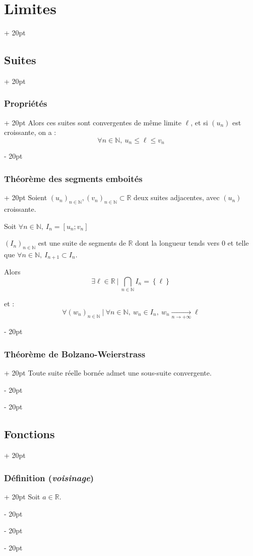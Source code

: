 \documentclass[a4paper, 12pt, twoside]{article}
\newcommand{\N}{\mathbb{N}} %
\newcommand{\R}{\mathbb{R}} %
\newcommand{\tendsto}[1]{\xrightarrow[#1]{}}
\newcommand{\set}[1]{\left\{ #1 \right\}}
\renewcommand{\le}{\leqslant}
\newcommand{\ind}[1][20pt]{\advance\leftskip + #1}
\newcommand{\deind}[1][20pt]{\advance\leftskip - #1}
\newenvironment{indt}[2][20pt]{#2 \par \ind[#1]}{\par \deind} %
\begin{document}
\begin{indt}{\section{Limites}}
\begin{indt}{\subsection{Suites}}
\begin{indt}{\subsubsection{Propriétés}}
                Alors ces suites sont convergentes de même limite $\ell$, et si $(u_n)$ est croissante, on a :
                \[
                    \forall n \in \N,\ u_n \le \ell \le v_n
                \]
            \end{indt}

            \vspace{12pt}
            
            \begin{indt}{\subsubsection{Théorème des segments emboités}}
                Soient $(u_n)_{n \in \N}, (v_n)_{n \in \N} \subset \R$ deux suites adjacentes, avec $(u_n)$ croissante.

                Soit $\forall n \in \N,\ I_n = [u_n ; v_n]$

                $(I_n)_{n \in \N}$ est une suite de segments de $\R$ dont la longueur tends vers $0$ et telle que $\forall n \in \N,\ I_{n + 1} \subset I_n$.

                \vspace{12pt}
                
                Alors
                \[
                    \displaystyle \exists \ell \in \R\ |\ \bigcap_{n \in \N} I_n = \set \ell
                \]

                et :
                \[
                    \forall (w_n)_{n \in \N}\ |\ \forall n \in \N,\ w_n \in I_n,\ w_n \tendsto{n \to +\infty} \ell
                \]
            \end{indt}

            \vspace{12pt}
            
            \begin{indt}{\subsubsection{Théorème de Bolzano-Weierstrass}}
                Toute suite réelle bornée admet une sous-suite convergente.
            \end{indt}
        \end{indt}

        \vspace{12pt}
        
        \begin{indt}{\subsection{Fonctions}}
            \begin{indt}{\subsubsection{Définition (\textit{voisinage})}}
                Soit $a \in \R$.


\end{indt}
\end{indt}
\end{indt}
\end{document}
